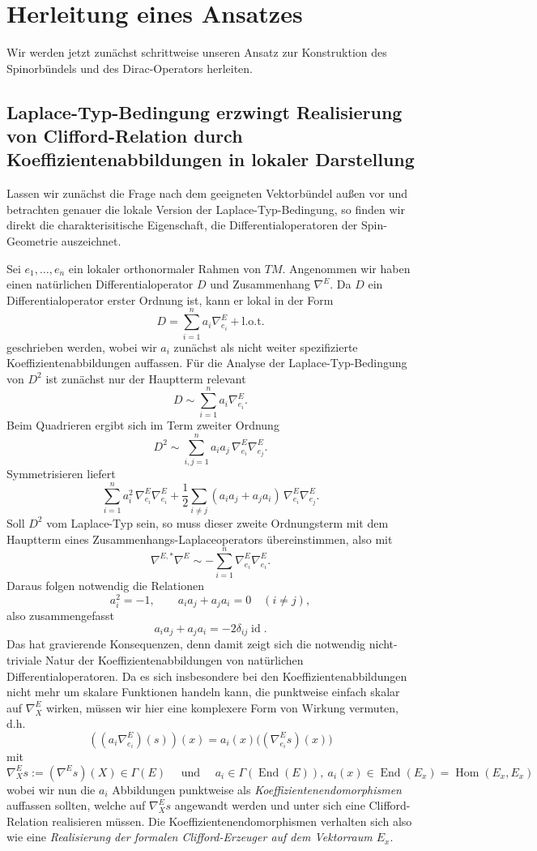 \documentclass[10pt, letterpaper]{article}
\newcommand{\id}{\operatorname{id}}
\begin{document}
\section{Herleitung eines Ansatzes}

Wir werden jetzt zunächst schrittweise unseren Ansatz zur Konstruktion des Spinorbündels und des Dirac-Operators herleiten.

\subsection{Laplace-Typ-Bedingung erzwingt Realisierung von Clifford-Relation durch Koeffizientenabbildungen in lokaler Darstellung}

Lassen wir zunächst die Frage nach dem geeigneten Vektorbündel außen vor und betrachten genauer die lokale Version der Laplace-Typ-Bedingung, so finden wir direkt die charakterisitische Eigenschaft, die Differentialoperatoren der Spin-Geometrie auszeichnet.



Sei \(e_1,\dots,e_n\) ein lokaler orthonormaler Rahmen von \(TM\). Angenommen wir haben einen natürlichen Differentialoperator $D$ und Zusammenhang $\nabla^E$. Da \(D\) ein Differentialoperator erster Ordnung ist, kann er lokal in der Form
\[
D=\sum_{i=1}^n a_i\nabla^E_{e_i}+ \text{l.o.t.}
\]
geschrieben werden, wobei wir $a_i$ zunächst als nicht weiter spezifizierte Koeffizientenabbildungen auffassen. Für die Analyse der Laplace-Typ-Bedingung von \(D^2\) ist zunächst nur der Hauptterm relevant
\[
D\sim \sum_{i=1}^n a_i\nabla^E_{e_i}.
\]
Beim Quadrieren ergibt sich im Term zweiter Ordnung
\[
D^2\sim \sum_{i,j=1}^n a_i a_j\,\nabla^E_{e_i}\nabla^E_{e_j}.
\]
Symmetrisieren liefert
\[
\sum_{i=1}^n a_i^2\,\nabla^E_{e_i}\nabla^E_{e_i}
+\frac12\sum_{i\neq j}(a_i a_j+a_j a_i)\,\nabla^E_{e_i}\nabla^E_{e_j}.
\]
Soll \(D^2\) vom Laplace-Typ sein, so muss dieser zweite Ordnungsterm mit dem Hauptterm eines Zusammenhangs-Laplaceoperators übereinstimmen, also mit
\[
\nabla^{E,*}\nabla^E \sim -\sum_{i=1}^n \nabla^E_{e_i}\nabla^E_{e_i}.
\] 
Daraus folgen notwendig die Relationen
\[
a_i^2=-1,
\qquad
a_i a_j+a_j a_i=0 \quad (i\neq j),
\]
also zusammengefasst
\[
a_i a_j+a_j a_i=-2\delta_{ij}\id.
\]
Das hat gravierende Konsequenzen, denn damit zeigt sich die notwendig nicht-triviale Natur der Koeffizientenabbildungen von natürlichen Differentialoperatoren. Da es sich insbesondere bei den Koeffizientenabbildungen nicht mehr um skalare Funktionen handeln kann, die punktweise einfach skalar auf $\nabla^E_{X}$ wirken, müssen wir hier eine komplexere Form von Wirkung vermuten, d.h.
$$\left(\left(a_i \nabla^E_{e_i}\right)(s)\right)(x)=a_i(x)\bigl(\left(\nabla^E_{e_i} s\right)(x)\bigr)$$
mit 
$$\nabla^E_X s:=(\nabla^E s)(X)\in\Gamma(E)\quad \text{ und }\quad  a_i \in \Gamma( \operatorname{End}(E)),\ a_i(x) \in \operatorname{End}\left(E_x\right)=\operatorname{Hom}\left(E_x, E_x\right) $$
wobei wir nun die $a_i$ Abbildungen punktweise als \emph{Koeffizientenendomorphismen} auffassen sollten, welche auf $\nabla^E_X s$ angewandt werden und unter sich eine Clifford-Relation realisieren müssen. Die Koeffizientenendomorphismen verhalten sich also wie eine \emph{Realisierung der formalen Clifford-Erzeuger auf dem Vektorraum $E_x$}.
\end{document}

